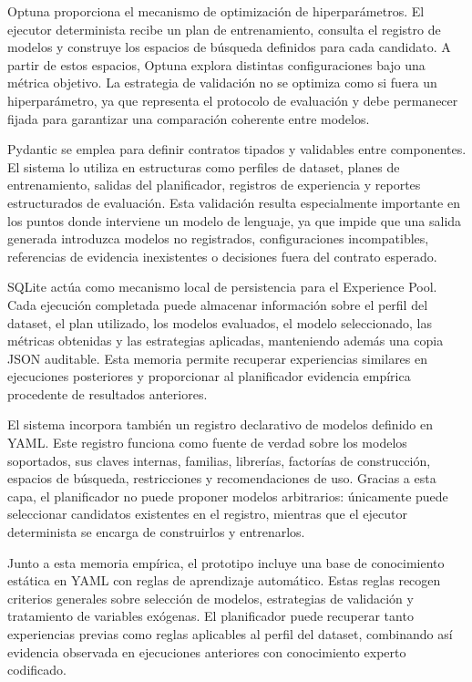 \documentclass[12pt,a4paper]{article}
\theoremstyle{plain}
\begin{document}
Optuna proporciona el mecanismo de optimización de hiperparámetros. El ejecutor determinista recibe un plan de entrenamiento, consulta el registro de modelos y construye los espacios de búsqueda definidos para cada candidato. A partir de estos espacios, Optuna explora distintas configuraciones bajo una métrica objetivo. La estrategia de validación no se optimiza como si fuera un hiperparámetro, ya que representa el protocolo de evaluación y debe permanecer fijada para garantizar una comparación coherente entre modelos.

Pydantic se emplea para definir contratos tipados y validables entre componentes. El sistema lo utiliza en estructuras como perfiles de dataset, planes de entrenamiento, salidas del planificador, registros de experiencia y reportes estructurados de evaluación. Esta validación resulta especialmente importante en los puntos donde interviene un modelo de lenguaje, ya que impide que una salida generada introduzca modelos no registrados, configuraciones incompatibles, referencias de evidencia inexistentes o decisiones fuera del contrato esperado.

SQLite actúa como mecanismo local de persistencia para el Experience Pool. Cada ejecución completada puede almacenar información sobre el perfil del dataset, el plan utilizado, los modelos evaluados, el modelo seleccionado, las métricas obtenidas y las estrategias aplicadas, manteniendo además una copia JSON auditable. Esta memoria permite recuperar experiencias similares en ejecuciones posteriores y proporcionar al planificador evidencia empírica procedente de resultados anteriores.

El sistema incorpora también un registro declarativo de modelos definido en YAML. Este registro funciona como fuente de verdad sobre los modelos soportados, sus claves internas, familias, librerías, factorías de construcción, espacios de búsqueda, restricciones y recomendaciones de uso. Gracias a esta capa, el planificador no puede proponer modelos arbitrarios: únicamente puede seleccionar candidatos existentes en el registro, mientras que el ejecutor determinista se encarga de construirlos y entrenarlos.

Junto a esta memoria empírica, el prototipo incluye una base de conocimiento estática en YAML con reglas de aprendizaje automático. Estas reglas recogen criterios generales sobre selección de modelos, estrategias de validación y tratamiento de variables exógenas. El planificador puede recuperar tanto experiencias previas como reglas aplicables al perfil del dataset, combinando así evidencia observada en ejecuciones anteriores con conocimiento experto codificado.
\end{document}
